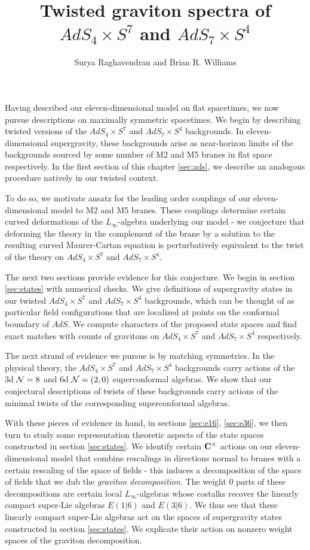 \documentclass{amsart}
\title{Twisted graviton spectra of $AdS_4\times S^7$ and $AdS_7\times S^4$}
\author{Surya Raghavendran and Brian R. Williams}
\begin{document}
\maketitle

\begin{abstract} %
\end{abstract}

\tableofcontents

Having described our eleven-dimensional model on flat spacetimes, we now pursue descriptions on maximally symmetric spacetimes. We begin by describing twisted versions of the $AdS_4\times S^7$ and $AdS_7\times S^4$ backgrounds. In eleven-dimensional supergravity, these backgrounds arise as near-horizon limits of the backgrounds sourced by some number of M2 and M5 branes in flat space respectively. In the first section of this chapter \ref{sec:ads}, we describe an analogous procedure natively in our twisted context. 

To do so, we motivate ansatz for the leading order couplings of our eleven-dimensional model to M2 and M5 branes. These couplings determine certain curved deformations of the $L_\infty$-algebra underlying our model - we conjecture that deforming the theory in the complement of the brane by a solution to the resulting curved Maurer-Cartan equation is perturbatively equivalent to the twist of the theory on $AdS_4\times S^7$ and $AdS_7\times S^4$. 

The next two sections provide evidence for this conjecture. We begin in section \ref{sec:states} with numerical checks. We give definitions of supergravity states in our twisted $AdS_4\times S^7$ and $AdS_7\times S^4$ backgrounds, which can be thought of as particular field configurations that are localized at points on the conformal boundary of $AdS$. We compute characters of the proposed state spaces and find exact matches with counts of gravitons on $AdS_4\times S^7$ and $AdS_7\times S^4$ respectively. 

The next strand of evidence we pursue is by matching symmetries. In the physical theory, the $AdS_4\times S^7$ and $AdS_7\times S^4$ backgrounds carry actions of the 3d $\mathcal{N}=8$ and 6d $\mathcal{N}=(2,0)$ superconformal algebras. We show that our conjectural descriptions of twists of these backgrounds carry actions of the minimal twists of the corresponding superconformal algebras. 

With these pieces of evidence in hand, in sections \ref{sec:e16}, \ref{sec:e36},  we then turn to study some representation theoretic aspects of the state spaces constructed in section \ref{sec:states}. We identify certain $\mathbf{C}^\times$ actions on our eleven-dimensional model that combine rescalings in directions normal to branes with a certain rescaling of the space of fields - this induces a decomposition of the space of fields that we dub the \textit{graviton decomposition}. The weight $0$ parts of these decompositions are certain local $L_\infty$-algebras whose costalks recover the linearly compact super-Lie algebras $E(1|6)$ and $E(3|6)$. We thus see that these linearly compact super-Lie algebras act on the spaces of supergravity states constructed in section \ref{sec:states}. We explicate their action on nonzero weight spaces of the graviton decomposition.
\end{document}
